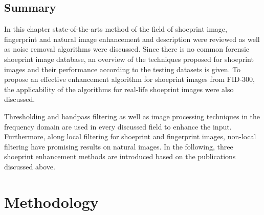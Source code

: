 \documentclass[draft,final]{vutinfth} %
\begin{document}
\section{Summary}
\par
In this chapter state-of-the-arts method of the field of shoeprint image, fingerprint and natural image enhancement and description were reviewed as well as noise removal algorithms were discussed.
Since there is no common forensic shoeprint image database, an overview of the techniques proposed for shoeprint images and their performance according to the testing datasets is given.
To propose an effective enhancement algorithm for shoeprint images from FID-300, the applicability of the algorithms for real-life shoeprint images were also discussed. 
\par
Thresholding and bandpass filtering as well as image processing techniques in the frequency domain are used in every discussed field to enhance the input.
Furthermore, along local filtering for shoeprint and fingerprint images, non-local filtering have promising results on natural images.
In the following, three shoeprint enhancement methods are introduced based on the publications discussed above.

 


\chapter{Methodology}
\end{document}
